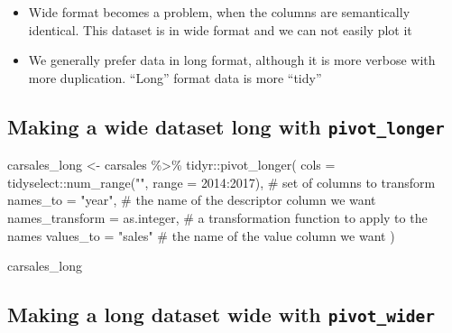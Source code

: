 \documentclass[
  letterpaper,
]{book}
\newenvironment{Shaded}{}{}
\newcommand{\AttributeTok}[1]{\textcolor[rgb]{0.84,0.23,0.29}{#1}}
\newcommand{\CommentTok}[1]{\textcolor[rgb]{0.42,0.45,0.49}{#1}}
\newcommand{\DecValTok}[1]{\textcolor[rgb]{0.00,0.36,0.77}{#1}}
\newcommand{\FunctionTok}[1]{\textcolor[rgb]{0.44,0.26,0.76}{#1}}
\newcommand{\NormalTok}[1]{\textcolor[rgb]{0.14,0.16,0.18}{#1}}
\newcommand{\OtherTok}[1]{\textcolor[rgb]{0.44,0.26,0.76}{#1}}
\newcommand{\SpecialCharTok}[1]{\textcolor[rgb]{0.00,0.36,0.77}{#1}}
\newcommand{\StringTok}[1]{\textcolor[rgb]{0.01,0.18,0.38}{#1}}
\providecommand{\tightlist}{%
  \setlength{\itemsep}{0pt}\setlength{\parskip}{0pt}}\usepackage{longtable,booktabs,array}
\begin{document}
\begin{itemize}
\tightlist
\item
  Wide format becomes a problem, when the columns are semantically
  identical. This dataset is in wide format and we can not easily plot
  it
\item
  We generally prefer data in long format, although it is more verbose
  with more duplication. ``Long'' format data is more ``tidy''
\end{itemize}

\hypertarget{making-a-wide-dataset-long-with-pivot_longer}{%
\subsection{\texorpdfstring{Making a wide dataset long with
\texttt{pivot\_longer}}{Making a wide dataset long with pivot\_longer}}\label{making-a-wide-dataset-long-with-pivot_longer}}

\begin{Shaded}
\begin{Highlighting}[]
\NormalTok{carsales\_long }\OtherTok{\textless{}{-}}\NormalTok{ carsales }\SpecialCharTok{\%\textgreater{}\%}\NormalTok{ tidyr}\SpecialCharTok{::}\FunctionTok{pivot\_longer}\NormalTok{(}
  \AttributeTok{cols =}\NormalTok{ tidyselect}\SpecialCharTok{::}\FunctionTok{num\_range}\NormalTok{(}\StringTok{""}\NormalTok{, }\AttributeTok{range =} \DecValTok{2014}\SpecialCharTok{:}\DecValTok{2017}\NormalTok{), }\CommentTok{\# set of columns to transform}
  \AttributeTok{names\_to =} \StringTok{"year"}\NormalTok{,            }\CommentTok{\# the name of the descriptor column we want}
  \AttributeTok{names\_transform =}\NormalTok{ as.integer, }\CommentTok{\# a transformation function to apply to the names}
  \AttributeTok{values\_to =} \StringTok{"sales"}           \CommentTok{\# the name of the value column we want}
\NormalTok{)}

\NormalTok{carsales\_long}
\end{Highlighting}
\end{Shaded}

\hypertarget{making-a-long-dataset-wide-with-pivot_wider}{%
\subsection{\texorpdfstring{Making a long dataset wide with
\texttt{pivot\_wider}}{Making a long dataset wide with pivot\_wider}}\label{making-a-long-dataset-wide-with-pivot_wider}}
\end{document}
